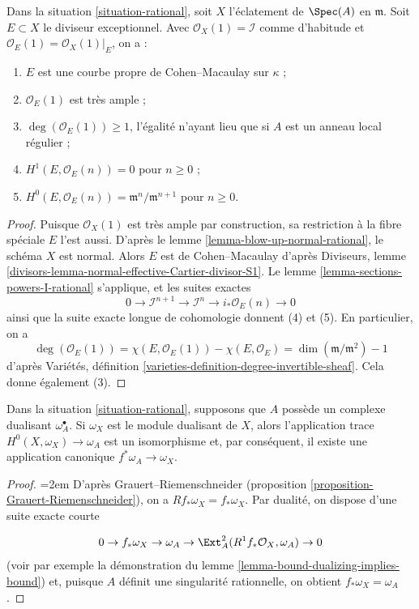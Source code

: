 \begin{lemma} \label{lemma-cohomology-blow-up-rational} Dans la situation \ref{situation-rational}, soit $X$ l'éclatement de $\Spec(A)$ en $\mathfrak m$. Soit $E \subset X$ le diviseur exceptionnel. Avec $\mathcal{O}_X(1) = \mathcal{I}$ comme d'habitude et $\mathcal{O}_E(1) = \mathcal{O}_X(1)|_E$, on a : \begin{enumerate} \item $E$ est une courbe propre de Cohen--Macaulay sur $\kappa$ ; \item $\mathcal{O}_E(1)$ est très ample ; \item $\deg(\mathcal{O}_E(1)) \geq 1$, l'égalité n'ayant lieu que si $A$ est un anneau local régulier ; \item $H^1(E, \mathcal{O}_E(n)) = 0$ pour $n \geq 0$ ; \item $H^0(E, \mathcal{O}_E(n)) = \mathfrak m^n/\mathfrak m^{n + 1}$ pour $n \geq 0$. \end{enumerate} \end{lemma}

\begin{proof} Puisque $\mathcal{O}_X(1)$ est très ample par construction, sa restriction à la fibre spéciale $E$ l'est aussi. D'après le lemme \ref{lemma-blow-up-normal-rational}, le schéma $X$ est normal. Alors $E$ est de Cohen--Macaulay d'après Diviseurs, lemme \ref{divisors-lemma-normal-effective-Cartier-divisor-S1}. Le lemme \ref{lemma-sections-powers-I-rational} s'applique, et les suites exactes $$
0 \to \mathcal{I}^{n + 1} \to \mathcal{I}^n \to i_*\mathcal{O}_E(n) \to 0
$$ ainsi que la suite exacte longue de cohomologie donnent (4) et (5). En particulier, on a $$
\deg(\mathcal{O}_E(1)) = \chi(E, \mathcal{O}_E(1)) - \chi(E, \mathcal{O}_E) =
\dim(\mathfrak m/\mathfrak m^2) - 1
$$ d'après Variétés, définition \ref{varieties-definition-degree-invertible-sheaf}. Cela donne également (3). \end{proof}

\begin{lemma} \label{lemma-dualizing-rational} Dans la situation \ref{situation-rational}, supposons que $A$ possède un complexe dualisant $\omega_A^\bullet$. Si $\omega_X$ est le module dualisant de $X$, alors l'application trace $H^0(X, \omega_X) \to \omega_A$ est un isomorphisme et, par conséquent, il existe une application canonique $f^*\omega_A \to \omega_X$. \end{lemma}

\begin{proof} \begingroup\emergencystretch=2em
D'après Grauert--Riemenschneider (proposition \ref{proposition-Grauert-Riemenschneider}), on a $Rf_*\omega_X = f_*\omega_X$. Par dualité, on dispose d'une suite exacte courte\par\endgroup
$$
0 \to f_*\omega_X \to \omega_A \to
\Ext^2_A(R^1f_*\mathcal{O}_X, \omega_A) \to 0
$$ (voir par exemple la démonstration du lemme \ref{lemma-bound-dualizing-implies-bound}) et, puisque $A$ définit une singularité rationnelle, on obtient $f_*\omega_X = \omega_A$. \end{proof}

